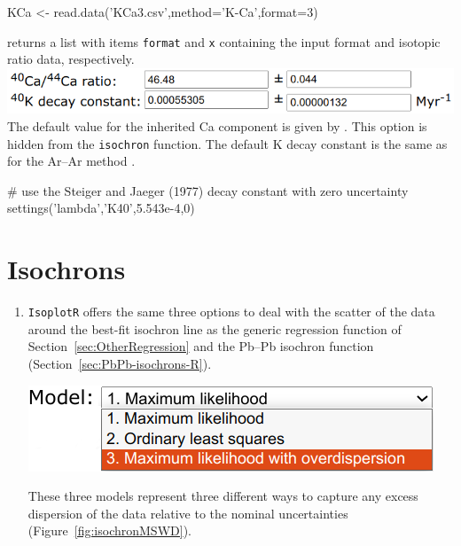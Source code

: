\begin{refsection}
\begin{console}
KCa <- read.data('KCa3.csv',method='K-Ca',format=3)
\end{console}

\noindent returns a list with items \texttt{format} and \texttt{x}
containing the input format and isotopic ratio data, respectively.\\

\noindent\includegraphics[width=.7\linewidth]{../figures/KCaLambda.png}\\

\noindent The default value for the inherited Ca component is given by
\citet{moore1972}. This option is hidden from the \texttt{isochron}
function. The default K decay constant is the same as for the Ar--Ar
method \citep{renne2011}.

\begin{script}
# use the Steiger and Jaeger (1977) decay constant with zero uncertainty
settings('lambda','K40',5.543e-4,0)
\end{script}

\section{Isochrons}\label{sec:ArAr-isochrons-R}

\begin{enumerate}

\item \texttt{IsoplotR} offers the same three options to deal with the
  scatter of the data around the best-fit isochron line as the generic
  regression function of Section~\ref{sec:OtherRegression} and the
  Pb--Pb isochron function (Section~\ref{sec:PbPb-isochrons-R}).

\noindent\begin{minipage}[t]{.45\linewidth}
\strut\vspace*{-\baselineskip}\newline
\includegraphics[width=\linewidth]{../figures/ArArIsochronModels.png}
\end{minipage}
\begin{minipage}[t]{.55\linewidth}
  These three models represent three different ways to capture any
  excess dispersion of the data relative to the nominal uncertainties
  (Figure~\ref{fig:isochronMSWD}).
\end{minipage}


\end{enumerate}
\end{refsection}
